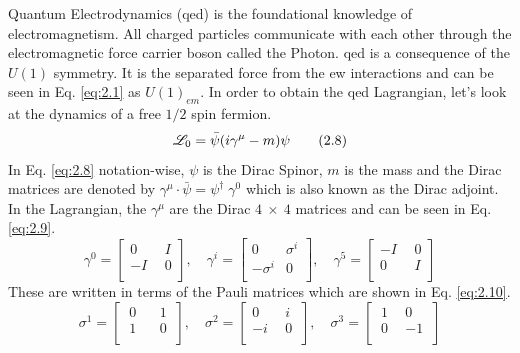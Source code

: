 Quantum Electrodynamics (\gls{qed}) is the foundational knowledge of electromagnetism. All charged particles
communicate with each other through the electromagnetic force carrier boson called the Photon. \gls{qed} is a 
consequence of the $U(1)$ symmetry. It is the separated force from the \gls{ew} interactions and can be seen 
in Eq. \ref{eq:2.1} as $U(1)_{em}$. In order to obtain the \gls{qed} Lagrangian, let's look at the dynamics of
a free $1/2$ spin fermion.
%
\begin{equation}\label{eq:2.8}
    \mathscr{L}_{0} = \bar{\psi}(i\gamma^{\mu}-m)\psi
\tag{2.8}
\end{equation}
%
In Eq. \ref{eq:2.8} notation-wise, $\psi$ is the Dirac Spinor, $m$ is the mass and the Dirac matrices are 
denoted by $\gamma^{\mu} \cdot \bar{\psi} = \psi^{\dag} \; \gamma^{0}$ which is also known as the Dirac adjoint.
In the Lagrangian, the $\gamma^{\mu}$ are the Dirac $4 \ \times \ 4$ matrices and can be seen in Eq. \ref{eq:2.9}.
%
\begin{equation}\label{eq:2.9}
    \gamma^{0}=
    \begin{bmatrix}
        0 \ \ & I \\
        -I \ \ & 0 \\
    \end{bmatrix}
    ,
    \quad
    \gamma^{i}=
    \begin{bmatrix}
        0  & \sigma^{i} \\
        -\sigma^{i} & 0 \\
    \end{bmatrix}
    ,
    \quad
    \gamma^{5}=
    \begin{bmatrix}
        -I \ \ & 0 \\
        0 \ \ & I \\
    \end{bmatrix}
\tag{2.9}    
\end{equation}
%
These are written in terms of the Pauli matrices which are shown in Eq. \ref{eq:2.10}.
%
\begin{equation}\label{eq:2.10}
    \sigma^{1}=
    \begin{bmatrix}
       \ 0 \ \ \  \ & 1 \ \\
       \ 1 \ \ \  \ & 0 \ \\
    \end{bmatrix}
    ,
    \quad
    \sigma^{2}=
    \begin{bmatrix}
        0  \ \  & i \ \\
        -i \ \  & 0 \ \\
    \end{bmatrix}
    ,
    \quad
    \sigma^{3}=
    \begin{bmatrix}
       \ 1 \  \ & 0 \ \\
       \ 0 \  \ & -1 \ \\
    \end{bmatrix}
\tag{2.10}
\end{equation}
